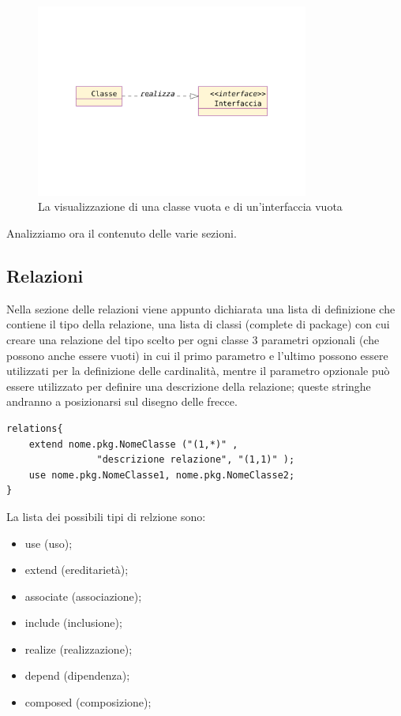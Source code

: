 \begin{figure}[htp]
\begin{center}
  \includegraphics[width=0.8\textwidth]{img/class_interface}
  \caption[labelInTOC]{La visualizzazione di una classe vuota e di
  un'interfaccia vuota}
\end{center}
\end{figure}


Analizziamo ora il contenuto delle varie sezioni.

\subsection{Relazioni}

Nella sezione delle relazioni
viene appunto dichiarata una lista di definizione che contiene il tipo della 
relazione, una lista di classi (complete di package) 
con cui creare una relazione del tipo scelto
per ogni classe 3 parametri opzionali (che possono anche essere vuoti) in cui
il primo parametro e l'ultimo possono essere utilizzati per la definizione delle
cardinalità, mentre il parametro opzionale può essere utilizzato per definire
una descrizione della relazione; queste stringhe andranno a posizionarsi sul 
disegno delle frecce.

\begin{lstlisting}[caption={Dichiarazione di relazione}, style={model}]
relations{
	extend nome.pkg.NomeClasse ("(1,*)" , 
				"descrizione relazione", "(1,1)" );
	use nome.pkg.NomeClasse1, nome.pkg.NomeClasse2;
}
\end{lstlisting}

La lista dei possibili tipi di relzione sono:
\begin{itemize}
  \item{use (uso);}
  \item{extend (ereditarietà);}
  \item{associate (associazione);}
  \item{include (inclusione);}
  \item{realize (realizzazione);}
  \item{depend (dipendenza);}
  \item{composed (composizione);}
\end{itemize}

